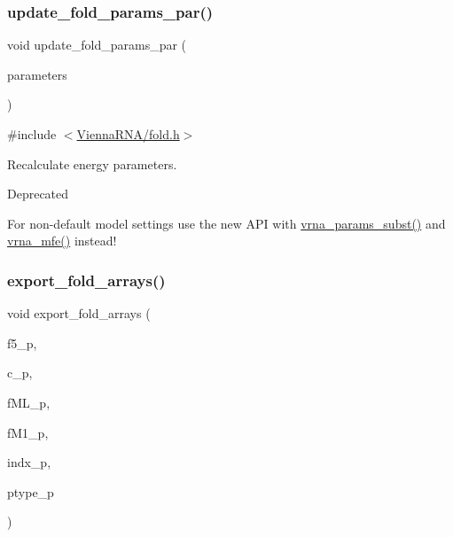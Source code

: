 \subsubsection{\texorpdfstring{update\+\_\+fold\+\_\+params\+\_\+par()}{update\_fold\_params\_par()}}
{\footnotesize\ttfamily void update\+\_\+fold\+\_\+params\+\_\+par (\begin{DoxyParamCaption}\item[{\mbox{\hyperlink{group__energy__parameters_ga8a69ca7d787e4fd6079914f5343a1f35}{vrna\+\_\+param\+\_\+t}} $\ast$}]{parameters }\end{DoxyParamCaption})}



{\ttfamily \#include $<$\mbox{\hyperlink{fold_8h}{Vienna\+R\+N\+A/fold.\+h}}$>$}



Recalculate energy parameters. 

\begin{DoxyRefDesc}{Deprecated}
\item[\mbox{\hyperlink{deprecated__deprecated000075}{Deprecated}}]For non-\/default model settings use the new A\+PI with \mbox{\hyperlink{group__energy__parameters_ga5d1909208f7ea3baa98b75afaa1f62ca}{vrna\+\_\+params\+\_\+subst()}} and \mbox{\hyperlink{group__mfe__fold_gabd3b147371ccf25c577f88bbbaf159fd}{vrna\+\_\+mfe()}} instead!\end{DoxyRefDesc}
\mbox{\label{group__mfe__fold__single_ga99641b8dbb40891da5490d3cc271e607}} 
\subsubsection{\texorpdfstring{export\+\_\+fold\+\_\+arrays()}{export\_fold\_arrays()}}
{\footnotesize\ttfamily void export\+\_\+fold\+\_\+arrays (\begin{DoxyParamCaption}\item[{int $\ast$$\ast$}]{f5\+\_\+p,  }\item[{int $\ast$$\ast$}]{c\+\_\+p,  }\item[{int $\ast$$\ast$}]{f\+M\+L\+\_\+p,  }\item[{int $\ast$$\ast$}]{f\+M1\+\_\+p,  }\item[{int $\ast$$\ast$}]{indx\+\_\+p,  }\item[{char $\ast$$\ast$}]{ptype\+\_\+p }\end{DoxyParamCaption})}



